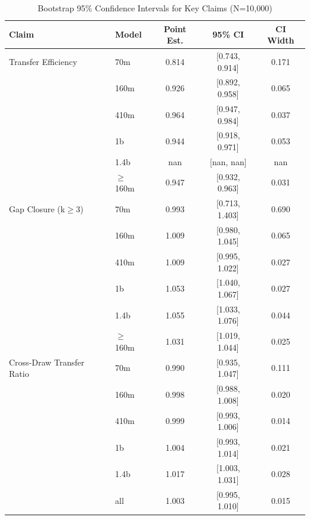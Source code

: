 \begin{table}[ht]
\centering
\caption{Bootstrap 95\% Confidence Intervals for Key Claims (N=10{,}000)}
\label{tab:bootstrap_ci}
\begin{tabular}{llccc}
\toprule
Claim & Model & Point Est. & 95\% CI & CI Width \\
\midrule
Transfer Efficiency & 70m & 0.814 & [0.743, 0.914] & 0.171 \\
 & 160m & 0.926 & [0.892, 0.958] & 0.065 \\
 & 410m & 0.964 & [0.947, 0.984] & 0.037 \\
 & 1b & 0.944 & [0.918, 0.971] & 0.053 \\
 & 1.4b & nan & [nan, nan] & nan \\
 & $\geq$160m & 0.947 & [0.932, 0.963] & 0.031 \\
\midrule
Gap Closure (k$\geq$3) & 70m & 0.993 & [0.713, 1.403] & 0.690 \\
 & 160m & 1.009 & [0.980, 1.045] & 0.065 \\
 & 410m & 1.009 & [0.995, 1.022] & 0.027 \\
 & 1b & 1.053 & [1.040, 1.067] & 0.027 \\
 & 1.4b & 1.055 & [1.033, 1.076] & 0.044 \\
 & $\geq$160m & 1.031 & [1.019, 1.044] & 0.025 \\
\midrule
Cross-Draw Transfer Ratio & 70m & 0.990 & [0.935, 1.047] & 0.111 \\
 & 160m & 0.998 & [0.988, 1.008] & 0.020 \\
 & 410m & 0.999 & [0.993, 1.006] & 0.014 \\
 & 1b & 1.004 & [0.993, 1.014] & 0.021 \\
 & 1.4b & 1.017 & [1.003, 1.031] & 0.028 \\
 & all & 1.003 & [0.995, 1.010] & 0.015 \\
\bottomrule
\end{tabular}
\end{table}
